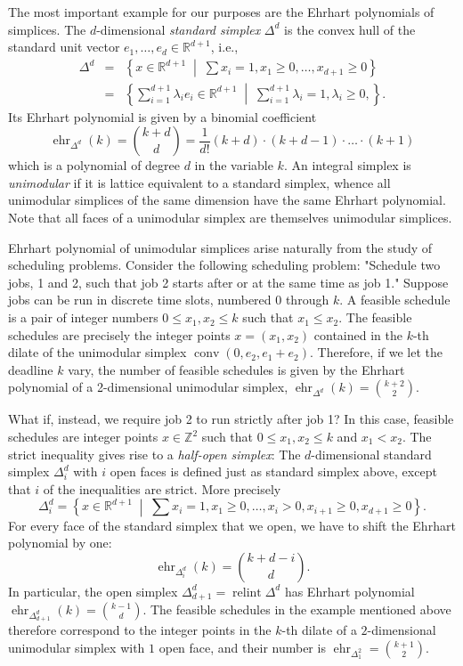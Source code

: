\documentclass[12pt,reqno]{amsart}
\numberwithin{definition}{section}
\theoremstyle{definition}
\newcommand{\RR}{\mathbb{R}}
\newcommand{\ZZ}{\mathbb{Z}}
\newcommand{\ehr}{\operatorname{ehr}}
\newcommand{\conv}{\operatorname{conv}}
\newcommand{\relint}{\operatorname{relint}}
\newcommand{\mset}[2]{ \left\{ #1 \; \middle| \; #2 \right\}}
\begin{document}
The most important example for our purposes are the Ehrhart polynomials of simplices. The $d$-dimensional \emph{standard simplex} $\Delta^d$ is the convex hull of the standard unit vector $e_1,\ldots,e_d\in\RR^{d+1}$, i.e.,
\begin{eqnarray*}
  \Delta^d &=& \mset{x\in\RR^{d+1}}{\sum x_i =1, x_1 \geq 0, \ldots, x_{d+1} \geq 0} \\
  &=& \mset{\sum_{i=1}^{d+1} \lambda_i e_i\in\RR^{d+1}}{\sum_{i=1}^{d+1} \lambda_i = 1, \lambda_i\geq 0, }.
\end{eqnarray*}
Its Ehrhart polynomial is given by a binomial coefficient
\[
  \ehr_{\Delta^d}(k) = \binom{k+d}{d} = \frac{1}{d!} (k+d)\cdot (k+d-1) \cdot \ldots \cdot (k+1)
\]
which is a polynomial of degree $d$ in the variable $k$. An integral simplex is \emph{unimodular} if it is lattice equivalent to a standard simplex, whence all unimodular simplices of the same dimension have the same Ehrhart polynomial. Note that all faces of a unimodular simplex are themselves unimodular simplices.

Ehrhart polynomial of unimodular simplices arise naturally from the study of scheduling problems. Consider the following scheduling problem: "Schedule two jobs, 1 and 2, such that job 2 starts after or at the same time as job 1." Suppose jobs can be run in discrete time slots, numbered $0$ through $k$. A feasible schedule is a pair of integer numbers $0\leq x_1,x_2 \leq k$ such that $x_1 \leq x_2$. The feasible schedules are precisely the integer points $x=(x_1,x_2)$ contained in the $k$-th dilate of the unimodular simplex $\conv(0,e_2,e_1+e_2)$. Therefore, if we let the deadline $k$ vary, the number of feasible schedules is given by the Ehrhart polynomial of a 2-dimensional unimodular simplex, $\ehr_{\Delta^d}(k)=\binom{k+2}{2}$.

What if, instead, we require job 2 to run strictly after job 1? In this case, feasible schedules are integer points $x\in\ZZ^2$ such that $0\leq x_1,x_2 \leq k$ and $x_1 < x_2$. The strict inequality gives rise to a \emph{half-open simplex}: The $d$-dimensional standard simplex $\Delta^d_i$ with $i$ open faces is defined just as standard simplex above, except that $i$ of the inequalities are strict. More precisely
\[
    \Delta^d_i = \mset{x\in\RR^{d+1}}{\sum x_i =1, x_1 \geq 0, \ldots, x_i > 0, x_{i+1} \geq 0, x_{d+1} \geq 0}.
\]
For every face of the standard simplex that we open, we have to shift the Ehrhart polynomial by one:
\[
  \ehr_{\Delta^d_i}(k) = \binom{k+d-i}{d}.
\]
In particular, the open simplex $\Delta^d_{d+1} = \relint{\Delta^d}$ has Ehrhart polynomial $\ehr_{\Delta^d_{d+1}}(k) = \binom{k-1}{d}$. The feasible schedules in the example mentioned above therefore correspond to the integer points in the $k$-th dilate of a $2$-dimensional unimodular simplex with $1$ open face, and their number is $\ehr_{\Delta^2_1} = \binom{k+1}{2}$.
\end{document}
